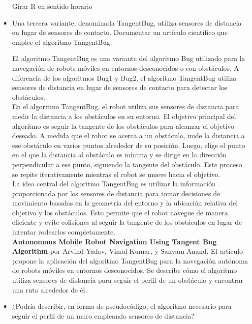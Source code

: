 \documentclass{article}
\begin{document}
\begin{itemize}
\begin{algorithm}
{{{{{            }
          }{
            Girar R en sentido horario\;
          }
        }
      }
    }
    
  \end{algorithm}
  
  \newpage
\item Una tercera variante, denominada TangentBug, utiliza sensores de distancia en lugar de sensores de contacto. Documentar un artículo científico que emplee el algoritmo TangentBug.

  El algoritmo TangentBug es una variante del algoritmo Bug utilizado para la navegación de robots móviles en entornos desconocidos o con obstáculos. A diferencia de los algoritmos Bug1 y Bug2, el algoritmo TangentBug utiliza sensores de distancia en lugar de sensores de contacto para detectar los obstáculos.\\

  En el algoritmo TangentBug, el robot utiliza sus sensores de distancia para medir la distancia a los obstáculos en su entorno. El objetivo principal del algoritmo es seguir la tangente de los obstáculos para alcanzar el objetivo deseado. A medida que el robot se acerca a un obstáculo, mide la distancia a ese obstáculo en varios puntos alrededor de su posición. Luego, elige el punto en el que la distancia al obstáculo es mínima y se dirige en la dirección perpendicular a ese punto, siguiendo la tangente del obstáculo. Este proceso se repite iterativamente mientras el robot se mueve hacia el objetivo.\\

  La idea central del algoritmo TangentBug es utilizar la información proporcionada por los sensores de distancia para tomar decisiones de movimiento basadas en la geometría del entorno y la ubicación relativa del objetivo y los obstáculos. Esto permite que el robot navegue de manera eficiente y evite colisiones al seguir la tangente de los obstáculos en lugar de intentar rodearlos completamente.\\

  \textbf{Autonomous Mobile Robot Navigation Using Tangent Bug Algorithm} por Arvind Yadav, Vimal Kumar, y Sanyam Anand. El artículo propone la aplicación del algoritmo TangentBug para la navegación autónoma de robots móviles en entornos desconocidos. Se describe cómo el algoritmo utiliza sensores de distancia para seguir el perfil de un obstáculo y encontrar una ruta alrededor de él.

  \newpage
\item ¿Podría describir, en forma de pseudocódigo, el algoritmo necesario para seguir el perfil de un muro empleando sensores de distancia?


\end{itemize}
\end{document}
